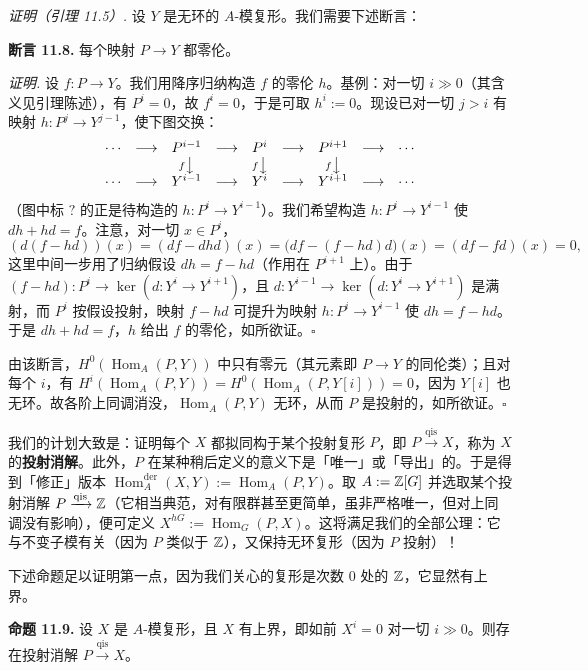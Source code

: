 \textit{证明（引理 11.5）.} 设 $Y$ 是无环的 $A$-模复形。我们需要下述断言：

\textbf{断言 11.8.} 每个映射 $P\to Y$ 都零伦。

\textit{证明.} 设 $f\colon P\to Y$。我们用降序归纳构造 $f$ 的零伦 $h$。基例：对一切 $i\gg0$（其含义见引理陈述），有 $P^i=0$，故 $f^i=0$，于是可取 $h^i:=0$。现设已对一切 $j>i$ 有映射 $h\colon P^j\to Y^{j-1}$，使下图交换：
\[
\begin{array}{ccccccccc}
\cdots & \longrightarrow & P^{i-1} & \longrightarrow & P^i & \longrightarrow & P^{i+1} & \longrightarrow & \cdots\\
& & {\scriptstyle f}\big\downarrow & & {\scriptstyle f}\big\downarrow & & {\scriptstyle f}\big\downarrow & & \\
\cdots & \longrightarrow & Y^{i-1} & \longrightarrow & Y^i & \longrightarrow & Y^{i+1} & \longrightarrow & \cdots
\end{array}
\]
（图中标 $?$ 的正是待构造的 $h\colon P^i\to Y^{i-1}$）。我们希望构造 $h\colon P^i\to Y^{i-1}$ 使 $dh+hd=f$。注意，对一切 $x\in P^i$，
\[
(d(f-hd))(x)=(df-dhd)(x)=\bigl(df-(f-hd)d\bigr)(x)=(df-fd)(x)=0,
\]
这里中间一步用了归纳假设 $dh=f-hd$（作用在 $P^{i+1}$ 上）。由于 $(f-hd)\colon P^i\to\ker(d\colon Y^i\to Y^{i+1})$，且 $d\colon Y^{i-1}\to\ker(d\colon Y^i\to Y^{i+1})$ 是满射，而 $P^i$ 按假设投射，映射 $f-hd$ 可提升为映射 $h\colon P^i\to Y^{i-1}$ 使 $dh=f-hd$。于是 $dh+hd=f$，$h$ 给出 $f$ 的零伦，如所欲证。\hfill$\square$

由该断言，$H^0(\operatorname{Hom}_A(P,Y))$ 中只有零元（其元素即 $P\to Y$ 的同伦类）；且对每个 $i$，有
$H^i(\operatorname{Hom}_A(P,Y))=H^0(\operatorname{Hom}_A(P,Y[i]))=0$，因为 $Y[i]$ 也无环。故各阶上同调消没，$\operatorname{Hom}_A(P,Y)$ 无环，从而 $P$ 是投射的，如所欲证。\hfill$\square$

我们的计划大致是：证明每个 $X$ 都拟同构于某个投射复形 $P$，即 $P\xrightarrow{\mathrm{qis}}X$，称为 $X$ 的\textbf{投射消解}。此外，$P$ 在某种稍后定义的意义下是「唯一」或「导出」的。于是得到「修正」版本 $\operatorname{Hom}^{\mathrm{der}}_A(X,Y):=\operatorname{Hom}_A(P,Y)$。取 $A:=\mathbb{Z}[G]$ 并选取某个投射消解 $P\xrightarrow{\mathrm{qis}}\mathbb{Z}$（它相当典范，对有限群甚至更简单，虽非严格唯一，但对上同调没有影响），便可定义 $X^{hG}:=\operatorname{Hom}_G(P,X)$。这将满足我们的全部公理：它与不变子模有关（因为 $P$ 类似于 $\mathbb{Z}$），又保持无环复形（因为 $P$ 投射）！

下述命题足以证明第一点，因为我们关心的复形是次数 $0$ 处的 $\mathbb{Z}$，它显然有上界。

\textbf{命题 11.9.} 设 $X$ 是 $A$-模复形，且 $X$ 有上界，即如前 $X^i=0$ 对一切 $i\gg0$。则存在投射消解 $P\xrightarrow{\mathrm{qis}}X$。

